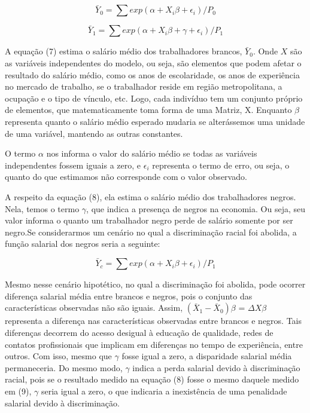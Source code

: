 \documentclass{article}
\begin{document}
	\begin{equation}
		\bar{Y}_{0} = \sum exp(\alpha + X_{i}\beta + \epsilon_{i})/P_{0} 
	\end{equation}
	
	\begin{equation}
		\bar{Y}_{1} = \sum exp(\alpha + X_{i}\beta + \gamma + \epsilon_{i})/P_{1}  
	\end{equation}
	
	A equação (7) estima o salário médio dos trabalhadores brancos, $\bar{Y}_{0}$. Onde $X$ são as variáveis independentes do modelo, ou seja, são elementos que podem afetar o resultado do salário médio, como os anos de escolaridade, os anos de experiência no mercado de trabalho, se o trabalhador reside em região metropolitana, a ocupação e o tipo de vínculo, etc. Logo, cada indivíduo tem um conjunto próprio de elementos, que matematicamente toma forma de uma Matriz, X. Enquanto $\beta$ representa quanto o salário médio esperado mudaria se alterássemos uma unidade de uma variável, mantendo as outras constantes. \newline
	
	O termo $\alpha$ nos informa o valor do salário médio se todas as variáveis independentes fossem iguais a zero, e $\epsilon_{i}$ representa o termo de erro, ou seja, o quanto do que estimamos não corresponde com o valor observado. \newline
	
	A respeito da equação (8), ela estima o salário médio dos trabalhadores negros. Nela, temos o termo $\gamma$, que indica a presença de negros na economia. Ou seja,  seu valor informa o quanto um trabalhador negro perde de salário somente por ser negro.Se considerarmos um cenário no qual a discriminação racial foi abolida, a função salarial dos negros seria a seguinte: \newline
	
	\begin{equation}
		\bar{Y}_{c} = \sum exp(\alpha + X_{i}\beta +  \epsilon_{i})/P_{1} 
	\end{equation}
	
	Mesmo nesse cenário hipotético, no qual a discriminação foi abolida, pode ocorrer diferença salarial média entre brancos e negros, pois o conjunto das características observadas não são iguais. Assim, $(\bar{X}_{1} - \bar{X}_{0})\beta$ = $\Delta X\beta$ representa a diferença nas características observadas entre brancos e negros. Tais diferenças decorrem do acesso desigual à educação de qualidade, redes de contatos profissionais que implicam em diferenças no tempo de experiência, entre outros. Com isso, mesmo que $\gamma$ fosse igual a zero, a disparidade salarial média permaneceria. Do mesmo modo, $\gamma$ indica a perda salarial devido à discriminação racial, pois se o resultado medido na equação (8) fosse o mesmo daquele medido em (9), $\gamma$ seria igual a zero, o que indicaria a inexistência de uma penalidade salarial devido à discriminação.	\newline
	
\end{document}
